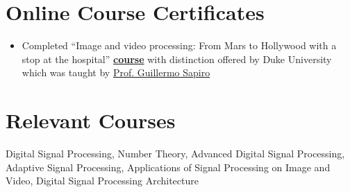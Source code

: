 \documentclass[margin, centered]{res}
\begin{document}
\begin{resume}
\section{Online Course Certificates}
\begin{itemize}[leftmargin=*]
 \item {Completed ``Image and video processing: From Mars to Hollywood with a stop at the hospital'' \href{https://www.dropbox.com/s/n3x5sz97q1qkq0f/Coursera\%20images\%202017.pdf?dl=0}{\textbf{course}} with distinction offered by Duke University which was taught by \href{http://ece.duke.edu/faculty/guillermo-sapiro}{Prof. Guillermo Sapiro} }

\end{itemize}

\section{Relevant \hspace{2mm} Courses}
Digital Signal Processing, Number Theory, Advanced Digital Signal Processing, Adaptive Signal Processing, Applications of Signal Processing on Image and Video, Digital Signal Processing Architecture



\end{resume}
\end{document}
